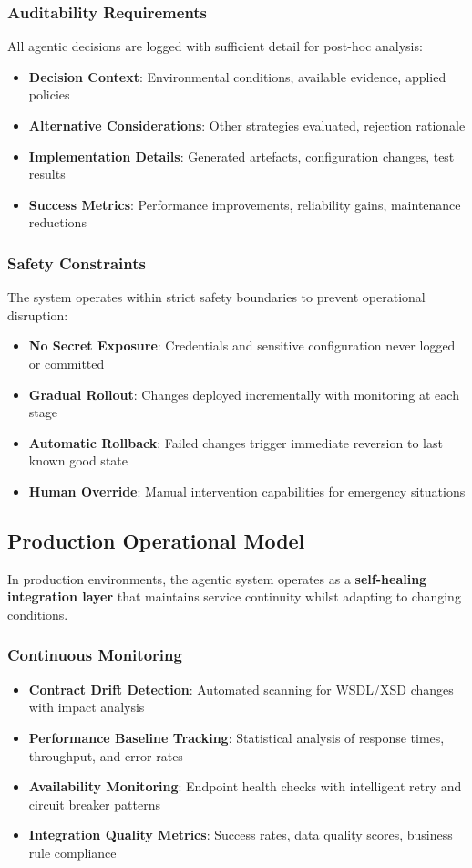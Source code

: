 \documentclass[11pt,a4paper]{article}
\begin{document}
\subsubsection{Auditability Requirements}
All agentic decisions are logged with sufficient detail for post-hoc analysis:
\begin{itemize}
\item \textbf{Decision Context}: Environmental conditions, available evidence, applied policies
\item \textbf{Alternative Considerations}: Other strategies evaluated, rejection rationale
\item \textbf{Implementation Details}: Generated artefacts, configuration changes, test results
\item \textbf{Success Metrics}: Performance improvements, reliability gains, maintenance reductions
\end{itemize}

\subsubsection{Safety Constraints}
The system operates within strict safety boundaries to prevent operational disruption:
\begin{itemize}
\item \textbf{No Secret Exposure}: Credentials and sensitive configuration never logged or committed
\item \textbf{Gradual Rollout}: Changes deployed incrementally with monitoring at each stage
\item \textbf{Automatic Rollback}: Failed changes trigger immediate reversion to last known good state
\item \textbf{Human Override}: Manual intervention capabilities for emergency situations
\end{itemize}

\subsection{Production Operational Model}
In production environments, the agentic system operates as a \textbf{self-healing integration layer} that maintains service continuity whilst adapting to changing conditions.

\subsubsection{Continuous Monitoring}
\begin{itemize}
\item \textbf{Contract Drift Detection}: Automated scanning for WSDL/XSD changes with impact analysis
\item \textbf{Performance Baseline Tracking}: Statistical analysis of response times, throughput, and error rates
\item \textbf{Availability Monitoring}: Endpoint health checks with intelligent retry and circuit breaker patterns
\item \textbf{Integration Quality Metrics}: Success rates, data quality scores, business rule compliance
\end{itemize}
\end{document}

